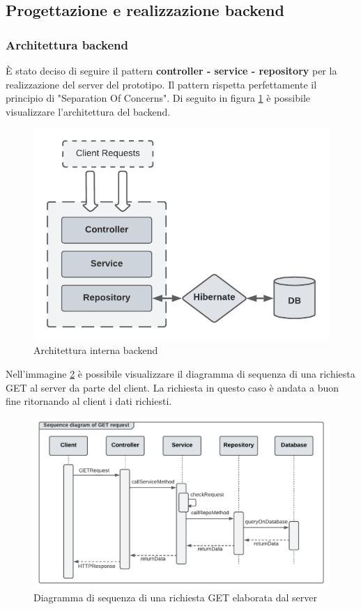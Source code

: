\subsection{Progettazione e realizzazione backend}
\subsubsection*{Architettura backend}
È stato deciso di seguire il pattern \textbf{controller - service - repository} per la realizzazione del server del prototipo.  Il pattern rispetta perfettamente il principio di "Separation Of Concerns". Di seguito in figura \ref{controller-service-repository} è possibile visualizzare l'architettura del backend.
\FloatBarrier
\begin{figure}[!h]
\centering
\includegraphics[width=0.8\linewidth]{immagini/controllerServiceRepository.pdf}
\caption{Architettura interna backend}
\label{controller-service-repository}
\end{figure}
\FloatBarrier
Nell'immagine \ref{sequence-diagram} è possibile visualizzare il diagramma di sequenza di una richiesta GET al server da parte del client. La richiesta in questo caso è andata a buon fine ritornando al client i dati richiesti.
\FloatBarrier
\begin{figure}[!h]
\centering
\includegraphics[width=1\linewidth]{immagini/getRequestFromClient.pdf}
\caption{Diagramma di sequenza di una richiesta GET elaborata dal server}
\label{sequence-diagram}
\end{figure}
